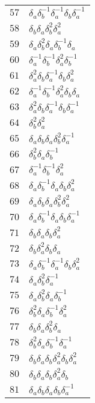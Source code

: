 \documentclass{article}
\begin{document}
\begin{center}
\begin{tabular}{ll}
$57$ & $\delta_a^{}\delta_b^{-1}\delta_a^{-1}\delta_b^{}\delta_a^{-1}$ \\
$58$ & $\delta_b^{}\delta_a^{}\delta_b^{2}\delta_a^{2}$ \\
$59$ & $\delta_a^{}\delta_b^{2}\delta_a^{}\delta_b^{-1}\delta_a^{}$ \\
$60$ & $\delta_a^{-1}\delta_b^{-1}\delta_a^{2}\delta_b^{-1}$ \\
$61$ & $\delta_a^{2}\delta_b^{}\delta_a^{-1}\delta_b^{}\delta_a^{2}$ \\
$62$ & $\delta_a^{-1}\delta_b^{-1}\delta_a^{2}\delta_b^{}\delta_a^{}$ \\
$63$ & $\delta_a^{2}\delta_b^{}\delta_a^{-1}\delta_b^{}\delta_a^{-1}$ \\
$64$ & $\delta_b^{2}\delta_a^{2}$ \\
$65$ & $\delta_a^{}\delta_b^{}\delta_a^{}\delta_b^{2}\delta_a^{-1}$ \\
$66$ & $\delta_b^{2}\delta_a^{}\delta_b^{-1}$ \\
$67$ & $\delta_a^{-1}\delta_b^{-1}\delta_a^{2}$ \\
$68$ & $\delta_a^{}\delta_b^{-1}\delta_a^{}\delta_b^{}\delta_a^{2}$ \\
$69$ & $\delta_a^{}\delta_b^{}\delta_a^{}\delta_b^{2}\delta_a^{2}$ \\
$70$ & $\delta_a^{}\delta_b^{-1}\delta_a^{}\delta_b^{}\delta_a^{-1}$ \\
$71$ & $\delta_b^{}\delta_a^{}\delta_b^{}\delta_a^{2}$ \\
$72$ & $\delta_b^{}\delta_a^{2}\delta_b^{}\delta_a^{}$ \\
$73$ & $\delta_a^{}\delta_b^{-1}\delta_a^{-1}\delta_b^{}\delta_a^{2}$ \\
$74$ & $\delta_a^{}\delta_b^{2}\delta_a^{-1}$ \\
$75$ & $\delta_a^{}\delta_b^{2}\delta_a^{}\delta_b^{-1}$ \\
$76$ & $\delta_b^{2}\delta_a^{}\delta_b^{-1}\delta_a^{2}$ \\
$77$ & $\delta_b^{}\delta_a^{}\delta_b^{2}\delta_a^{}$ \\
$78$ & $\delta_b^{2}\delta_a^{}\delta_b^{-1}\delta_a^{-1}$ \\
$79$ & $\delta_b^{}\delta_a^{}\delta_b^{}\delta_a^{2}\delta_b^{}\delta_a^{2}$ \\
$80$ & $\delta_b^{}\delta_a^{}\delta_b^{}\delta_a^{2}\delta_b^{}$ \\
$81$ & $\delta_a^{}\delta_b^{}\delta_a^{}\delta_b^{}\delta_a^{-1}$ \\

\end{tabular}
\end{center}
\end{document}
